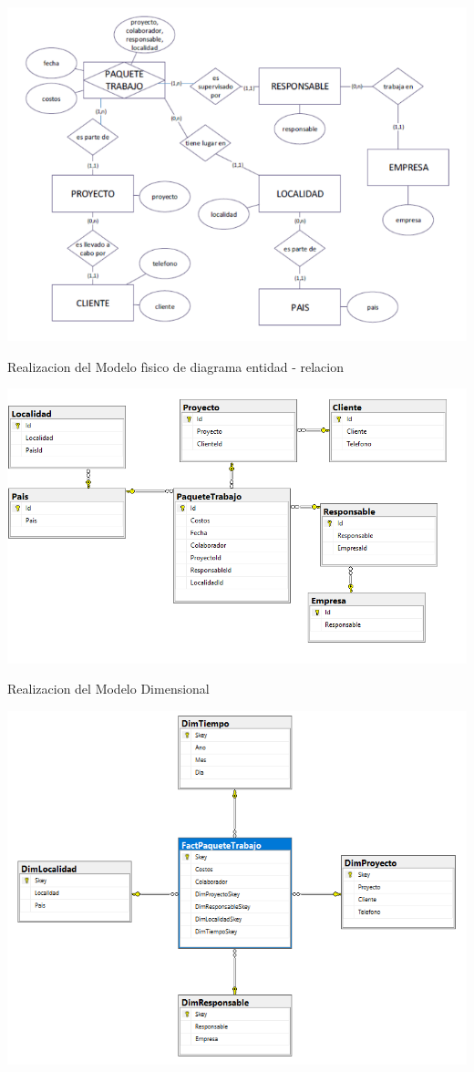 \begin{itemize}
\begin{center}
\includegraphics[width=16cm]{./Imagenes/tarea3.png}
\end{center}

Realizacion del Modelo fìsico de diagrama entidad - relacion

\begin{center}
\includegraphics[width=15cm]{./Imagenes/tarea333.png}
\end{center}

 Realizacion del Modelo Dimensional 
\begin{center}
\includegraphics[width=14cm]{./Imagenes/tarea33.png}
\end{center}


\end{itemize}
